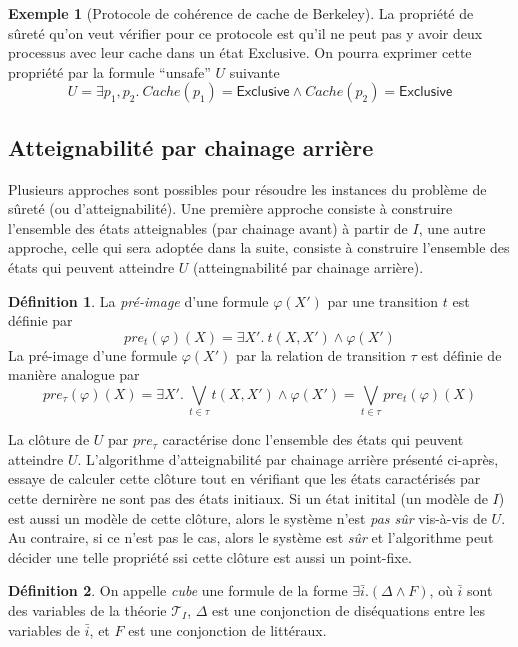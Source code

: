 \documentclass[a4paper, twoside]{scrartcl}
\theoremstyle{plain}%
\theoremstyle{definition}
\newtheorem{defn}{Définition}[section]
\newtheorem{exmp}{Exemple}[section]
\theoremstyle{remark}
\begin{document}
\begin{exmp}[Protocole de cohérence de cache de Berkeley]
  La propriété de sûreté qu'on veut vérifier pour ce protocole est
  qu'il ne peut pas y avoir deux processus avec leur cache dans un
  état \textsf{Exclusive}. On pourra exprimer cette propriété par la
  formule ``unsafe'' $U$ suivante
  \[
  U = \exists p_1, p_2.~ Cache(p_1) = \mathsf{Exclusive} \wedge
  Cache(p_2) = \mathsf{Exclusive}
  \]
  



\end{exmp}



\subsection{Atteignabilité par chainage arrière}


Plusieurs approches sont possibles pour résoudre les instances du
problème de sûreté (ou d'atteignabilité). Une première approche
consiste à construire l'ensemble des états atteignables (par chainage
avant) à partir de $I$, une autre approche, celle qui sera adoptée
dans la suite, consiste à construire l'ensemble des états qui peuvent
atteindre $U$ (atteingnabilité par chainage arrière).

\begin{defn}
  La \emph{pré-image} d'une formule $\varphi(X')$ par une transition
  $t$ est définie par 
  \[pre_t(\varphi)(X) = \exists X'.~ t(X,X') \wedge
  \varphi(X')\]
  La pré-image d'une formule $\varphi(X')$ par la
  relation de transition $\tau$ est définie de manière analogue par
  \[pre_\tau(\varphi)(X) = \exists X'.~ \bigvee_{t \in \tau} t(X,X')
  \wedge \varphi(X') = \bigvee_{t \in \tau} pre_t(\varphi)(X)\]
\end{defn}


La clôture de $U$ par $pre_\tau$ caractérise donc l'ensemble des états
qui peuvent atteindre $U$. L'algorithme d'atteignabilité par chainage
arrière présenté ci-après, essaye de calculer cette clôture tout en
vérifiant que les états caractérisés par cette dernirère ne sont pas
des états initiaux. Si un état initital (un modèle de $I$) est aussi
un modèle de cette clôture, alors le système n'est \emph{pas sûr}
vis-à-vis de $U$. Au contraire, si ce n'est pas le cas, alors le
système est \emph{sûr} et l'algorithme peut décider une telle
propriété ssi cette clôture est aussi un point-fixe.

\begin{defn}
  On appelle \emph{cube} une formule de la forme $\exists \bar
  i. (\Delta \land F)$, où $\bar i$ sont des variables de la
  théorie $\mathcal{T}_I$, $\Delta$ est une conjonction de
  diséquations entre les variables de $\bar i$, et $F$ est une
  conjonction de littéraux.
\end{defn}
\end{document}
